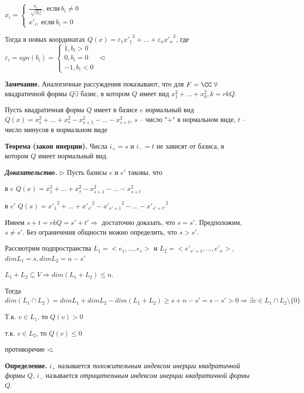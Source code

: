 $ x_i = \begin{cases}
		\frac{x_i}{\sqrt[]{|b_i|}}, \ если \ b_i \neq 0 \\
		x'_i, \ если \ b_i = 0
	\end{cases}$

Тогда в новых координатах $Q(x) = \varepsilon_1 {x'_1}^2 + \dots + \varepsilon_n {x'_n}^2$, где $\varepsilon_i = sgn(b_i) = \begin{cases}
		1, b_i > 0 \\
		0, b_i = 0 \\
        -1, b_i < 0 
	\end{cases} \ \lhd$
    

\bigskip
\textbf{Замечание.} Аналогичные рассуждения показывают, что для $F = \CC \ \forall$ квадратичной формы $Q \exists$ базис, в котором $Q$ имеет вид $x_1^2 + \dots + x_k^2, k = rkQ$.

\bigskip
Пусть квадратичная форма $Q$ имеет в базисе $e$ нормальный вид $Q(x) = x_1^2 + \dots + x_s^2 - x_{s+1}^2 - \dots - x_{s+t}^2$, $s$ -- число "+" в нормальном виде, $t$ -- число минусов в нормальном виде

\bigskip
\textbf{Теорема (закон инерции).} Числа $i_+ = s$ и $i_- = t$ не зависят от базиса, в котором $Q$ имеет нормальный вид.

\bigskip
\textbf{\textit{Доказательство.}} $\rhd$ Пусть базисы $e$ и $e'$ таковы, что 

в $e$ $Q(x) = x_1^2 + \dots + x_s^2 - x_{s+1}^2 - \dots - x_{s+t}^2$

в $e'$ $Q(x) = {x'_1}^2 + \dots + {x'_{s'}}^2 - {x'_{s'+1}}^2 - \dots - {x'_{s'+ t'}}^2$

Имеем $s + t = rkQ = s' + t' \Rightarrow$ достаточно доказать, что $s = s'$. Предположим, $s \neq s'$. Без ограничения общности можно определить, что $s > s'$.

Рассмотрим подпространства $L_1 = <e_1, \dots, e_s>$ и $L_2 = <e'_{s'+1}, \dots, e'_n>$, $dimL_1 = s, dimL_2 = n-s'$

$L_1 + L_2 \subseteq V \Rightarrow dim (L_1 + L_2) \leq n$.

Тогда $dim(L_1 \cap L_2) = dimL_1 + dimL_2 - dim(L_1 + L_2) \geq s + n - s' = s - s'> 0 \Rightarrow \exists v \in L_1 \cap L_2 \setminus \{0\} $

Т.к. $v \in L_1$, то $Q(v) > 0$

т.к. $v \in L_2$, то $Q(v) \leq 0$

противоречие $\lhd$.

\bigskip
\textbf{Определение.} $i_+$ называется \textit{положительным индексом инерции квадратичной формы} $Q$, $i_-$ называется \textit{отрицательным индексом инерции квадратичной формы} $Q$.

